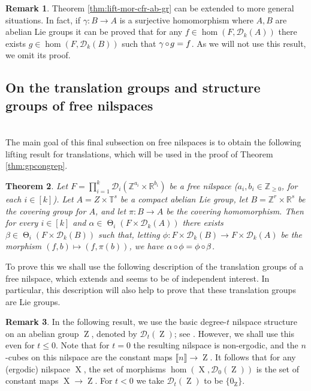 \documentclass[a4paper,12pt,reqno]{amsart}
\newtheorem{theorem}{Theorem}[section]
\theoremstyle{definition}
\newtheorem{remark}[theorem]{Remark}
\def\to{\rightarrow}
\newcommand*{\db}[1]{\llbracket #1\rrbracket}
\newcommand{\mc}{\mathcal}
\newcommand{\mb}{\mathbb}
\DeclareMathOperator{\ab}{Z}
\DeclareMathOperator{\tran}{\Theta}
\DeclareMathOperator{\ns}{X}
\DeclareMathOperator{\co}{\circ\hspace{-0.02 cm}}
\begin{document}
\begin{remark}\label{rem:moregenlift}
Theorem \ref{thm:lift-mor-cfr-ab-gr} can be extended to more general situations. In fact, if $\gamma:B\to A$ is a surjective homomorphism where $A,B$ are abelian Lie groups it can be proved that for any $f\in \hom(F,\mc{D}_k(A))$ there exists $g\in \hom(F,\mc{D}_k(B))$ such that $\gamma\co g = f$. As we will not use this result, we omit its proof.
\end{remark}


\subsection{On the translation groups and structure groups of free nilspaces}\hfill\\
The main goal of this final subsection on free nilspaces is to obtain the following lifting result for translations, which will be used in the proof of Theorem \ref{thm:gpcongrep}.

\begin{theorem}\label{thm:lift-trans}
Let $F=\prod_{i=1}^k \mc{D}_i(\mb{Z}^{a_i}\times\mb{R}^{b_i})$ be a free nilspace \textup{(}$a_i,b_i\in\mb{Z}_{\ge 0}$, for each $i\in [k]$\textup{)}. Let $A=Z\times \mb{T}^s$ be a compact abelian Lie group, let $B=\mb{Z}^r\times \mb{R}^s$ be the covering group for $A$, and let $\pi:B\to A$ be the covering homomorphism. Then for every $i\in [k]$ and $\alpha\in \tran_i(F\times \mc{D}_k(A))$ there exists $\beta\in \tran_i(F\times \mc{D}_k(B))$ such that, letting $\phi:F\times\mc{D}_k(B)\to F\times \mc{D}_k(A)$ be the morphism $(f,b)\mapsto (f,\pi(b))$, we have $\alpha\co \phi= \phi\co \beta$.
\end{theorem}
\noindent To prove this we shall use the following description of the translation groups of a free nilspace, which extends \cite[Theorem 5.9]{CGSS-p-hom} and seems to be of independent interest. In particular, this description will also help to prove that these translation groups are Lie groups.

\begin{remark}\label{rem:D0}
In the following result, we use the basic degree-$t$ nilspace structure on an abelian group $\ab$, denoted by $\mc{D}_t(\ab)$; see \cite[equation $(2.9)$]{Cand:Notes1}. However, we shall use this even for $t\leq 0$. Note that for $t=0$ the resulting nilspace is non-ergodic, and the $n$-cubes on this nilspace are the constant maps $\db{n}\to\ab$.  It follows that for any (ergodic) nilspace $\ns$, the set of morphisms $\hom(\ns,\mc{D}_0(\ab))$ is the set of constant maps $\ns \to \ab$.  For $t<0$ we take $\mc{D}_t(\ab)$ to be $\{0_{\ab}\}$.
\end{remark}
\end{document}

